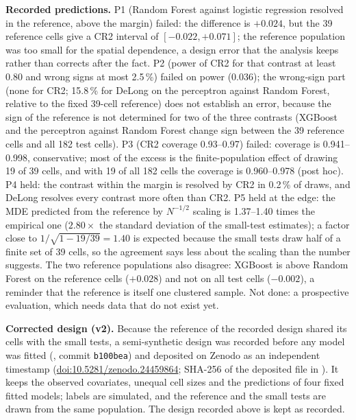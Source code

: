 \documentclass[11pt,a4paper]{article}
\begin{document}
\textbf{Recorded predictions.} P1 (Random Forest against logistic regression resolved in the reference, above the margin) failed: the difference is $+0.024$, but the 39 reference cells give a CR2 interval of $[-0.022,+0.071]$; the reference population was too small for the spatial dependence, a design error that the analysis keeps rather than corrects after the fact. P2 (power of CR2 for that contrast at least 0.80 and wrong signs at most 2.5\,\%) failed on power (0.036); the wrong-sign part (none for CR2; 15.8\,\% for DeLong on the perceptron against Random Forest, relative to the fixed 39-cell reference) does not establish an error, because the sign of the reference is not determined for two of the three contrasts (XGBoost and the perceptron against Random Forest change sign between the 39 reference cells and all 182 test cells). P3 (CR2 coverage 0.93--0.97) failed: coverage is 0.941--0.998, conservative; most of the excess is the finite-population effect of drawing 19 of 39 cells, and with 19 of all 182 cells the coverage is 0.960--0.978 (post hoc). P4 held: the contrast within the margin is resolved by CR2 in 0.2\,\% of draws, and DeLong resolves every contrast more often than CR2. P5 held at the edge: the MDE predicted from the reference by $N^{-1/2}$ scaling is 1.37--1.40 times the empirical one ($2.80\times$ the standard deviation of the small-test estimates); a factor close to $1/\sqrt{1-19/39}=1.40$ is expected because the small tests draw half of a finite set of 39 cells, so the agreement says less about the scaling than the number suggests. The two reference populations also disagree: XGBoost is above Random Forest on the reference cells ($+0.028$) and not on all test cells ($-0.002$), a reminder that the reference is itself one clustered sample. Not done: a prospective evaluation, which needs data that do not exist yet.

\textbf{Corrected design (v2).} Because the reference of the recorded design shared its cells with the small tests, a semi-synthetic design was recorded before any model was fitted (, commit \texttt{b100bea}) and deposited on Zenodo as an independent timestamp (\href{https://doi.org/10.5281/zenodo.24459864}{doi:10.5281/zenodo.24459864}; SHA-256 of the deposited file in ). It keeps the observed covariates, unequal cell sizes and the predictions of four fixed fitted models; labels are simulated, and the reference and the small tests are drawn from the same population. The design recorded above is kept as recorded.
\end{document}
